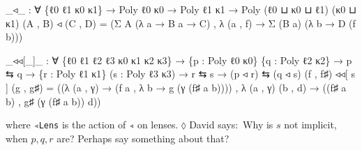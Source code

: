 \documentclass[
  11pt,
  oneside,
  article]{memoir}
\newenvironment{Shaded}{}{}
\newcommand{\NormalTok}[1]{#1}
\newcommand{\OtherTok}[1]{\textcolor[rgb]{0.00,0.44,0.13}{#1}}
\theoremstyle{definition}
\theoremstyle{plain}
\newcommand{\0}{\textsf{0}}
\newcommand{\1}{\tn{\textsf{1}}}
\newcommand{\dnote}[1]{{\quad \color{blue}$\lozenge$\;David says:}~#1\;{\color{blue}$\lozenge$}\quad}
\begin{document}
\begin{Shaded}
\begin{Highlighting}[]
\OtherTok{\_}\NormalTok{◃}\OtherTok{\_} \OtherTok{:} \OtherTok{∀} \OtherTok{\{}\NormalTok{ℓ0 ℓ1 κ0 κ1}\OtherTok{\}} \OtherTok{→}\NormalTok{ Poly ℓ0 κ0 }\OtherTok{→}\NormalTok{ Poly ℓ1 κ1 }\OtherTok{→}\NormalTok{ Poly }\OtherTok{(}\NormalTok{ℓ0 ⊔ κ0 ⊔ ℓ1}\OtherTok{)} \OtherTok{(}\NormalTok{κ0 ⊔ κ1}\OtherTok{)}
\OtherTok{(}\NormalTok{A , B}\OtherTok{)}\NormalTok{ ◃ }\OtherTok{(}\NormalTok{C , D}\OtherTok{)} \OtherTok{=} \OtherTok{(}\NormalTok{Σ A }\OtherTok{(λ}\NormalTok{ a }\OtherTok{→}\NormalTok{ B a }\OtherTok{→}\NormalTok{ C}\OtherTok{)}\NormalTok{ , }\OtherTok{λ} \OtherTok{(}\NormalTok{a , f}\OtherTok{)} \OtherTok{→}\NormalTok{ Σ }\OtherTok{(}\NormalTok{B a}\OtherTok{)} \OtherTok{(λ}\NormalTok{ b }\OtherTok{→}\NormalTok{ D }\OtherTok{(}\NormalTok{f b}\OtherTok{)))}

\OtherTok{\_}\NormalTok{◃◃[}\OtherTok{\_}\NormalTok{]}\OtherTok{\_} \OtherTok{:} \OtherTok{∀} \OtherTok{\{}\NormalTok{ℓ0 ℓ1 ℓ2 ℓ3 κ0 κ1 κ2 κ3}\OtherTok{\}}
        \OtherTok{→} \OtherTok{\{}\NormalTok{p }\OtherTok{:}\NormalTok{ Poly ℓ0 κ0}\OtherTok{\}} \OtherTok{\{}\NormalTok{q }\OtherTok{:}\NormalTok{ Poly ℓ2 κ2}\OtherTok{\}} \OtherTok{→}\NormalTok{ p ⇆ q}
        \OtherTok{→} \OtherTok{\{}\NormalTok{r }\OtherTok{:}\NormalTok{ Poly ℓ1 κ1}\OtherTok{\}} \OtherTok{(}\NormalTok{s }\OtherTok{:}\NormalTok{ Poly ℓ3 κ3}\OtherTok{)} \OtherTok{→}\NormalTok{ r ⇆ s }
        \OtherTok{→} \OtherTok{(}\NormalTok{p ◃ r}\OtherTok{)}\NormalTok{ ⇆ }\OtherTok{(}\NormalTok{q ◃ s}\OtherTok{)}
\OtherTok{(}\NormalTok{f , f♯}\OtherTok{)}\NormalTok{ ◃◃[ s ] }\OtherTok{(}\NormalTok{g , g♯}\OtherTok{)} \OtherTok{=}
    \OtherTok{((λ} \OtherTok{(}\NormalTok{a , γ}\OtherTok{)} \OtherTok{→} \OtherTok{(}\NormalTok{f a , }\OtherTok{λ}\NormalTok{ b\textquotesingle{} }\OtherTok{→}\NormalTok{ g }\OtherTok{(}\NormalTok{γ }\OtherTok{(}\NormalTok{f♯ a b\textquotesingle{}}\OtherTok{))))}
\NormalTok{    , }\OtherTok{λ} \OtherTok{(}\NormalTok{a , γ}\OtherTok{)} \OtherTok{(}\NormalTok{b\textquotesingle{} , d\textquotesingle{}}\OtherTok{)} \OtherTok{→} \OtherTok{((}\NormalTok{f♯ a b\textquotesingle{}}\OtherTok{)}\NormalTok{ , g♯ }\OtherTok{(}\NormalTok{γ }\OtherTok{(}\NormalTok{f♯ a b\textquotesingle{}}\OtherTok{))}\NormalTok{ d\textquotesingle{}}\OtherTok{))}
\end{Highlighting}
\end{Shaded}
where \texttt{◃Lens} is the action of \texttt{◃} on lenses.\dnote{Why is $s$ not implicit, when $p,q,r$ are? Perhaps say something about that?}
\end{document}
